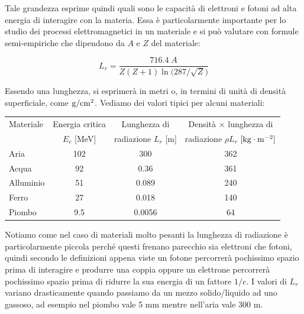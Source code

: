 Tale grandezza esprime quindi quali sono le capacità di elettroni e fotoni ad alta energia di interagire con la materia. Essa è particolarmente importante per lo studio dei processi elettromagnetici in un materiale e si può valutare con formule semi-empiriche che dipendono da $A$ e $Z$ del materiale:

\begin{equation*}
    L_r=\frac{716.4 \; A}{Z(Z+1)\ln \bigl( 287/\sqrt{Z} \bigr)}
\end{equation*}

Essendo una lunghezza, si esprimerà in metri o, in termini di unità di densità superficiale, come $\rm g/cm^2$. Vediamo dei valori tipici per alcuni materiali:

\begin{center}
    \begin{tabular}{|l|c|c|c|}
      \hline
      Materiale & Energia critica & Lunghezza di & Densità $\times$ lunghezza di\\
      & $E_c$ [MeV] & radiazione $L_r$ [m] & radiazione $\rho L_r$ $[\rm kg \cdot m^{-2}]$\\
      \hline
      Aria & 102 & 300 & 362\\
      \hline
      Acqua & 92 & 0.36 & 361\\
      \hline
      Alluminio & 51 & 0.089 & 240\\
      \hline
      Ferro & 27 & 0.018 & 140\\
      \hline
      Piombo & 9.5 & 0.0056 & 64\\
      \hline
    \end{tabular}
  \end{center}

Notiamo come nel caso di materiali molto pesanti la lunghezza di radiazione è particolarmente piccola perché questi frenano parecchio sia elettroni che fotoni, quindi secondo le definizioni appena viste un fotone percorrerà pochissimo spazio prima di interagire e produrre una coppia oppure un elettrone percorrerà pochissimo spazio prima di ridurre la sua energia di un fattore $1/e$. I valori di $L_r$ variano drasticamente quando passiamo da un mezzo solido/liquido ad uno gassoso, ad esempio nel piombo vale 5 mm mentre nell'aria vale 300 m.

